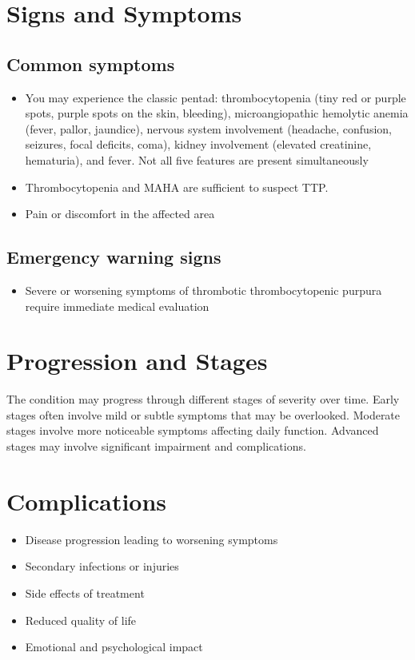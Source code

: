 \section{Signs and Symptoms}

\subsection{Common symptoms}
\begin{itemize}[noitemsep]
  \item You may experience the classic pentad: thrombocytopenia (tiny red or purple spots, purple spots on the skin, bleeding), microangiopathic hemolytic anemia (fever, pallor, jaundice), nervous system involvement (headache, confusion, seizures, focal deficits, coma), kidney involvement (elevated creatinine, hematuria), and fever. Not all five features are present simultaneously
  \item Thrombocytopenia and MAHA are sufficient to suspect TTP.
  \item Pain or discomfort in the affected area
  \end{itemize}

\subsection{Emergency warning signs}
\begin{itemize}[noitemsep]
  \item Severe or worsening symptoms of thrombotic thrombocytopenic purpura require immediate medical evaluation
\end{itemize}
\section{Progression and Stages}
The condition may progress through different stages of severity over time. Early stages often involve mild or subtle symptoms that may be overlooked. Moderate stages involve more noticeable symptoms affecting daily function. Advanced stages may involve significant impairment and complications.
\section{Complications}
\begin{itemize}[noitemsep]
  \item Disease progression leading to worsening symptoms
  \item Secondary infections or injuries
  \item Side effects of treatment
  \item Reduced quality of life
  \item Emotional and psychological impact
\end{itemize}
